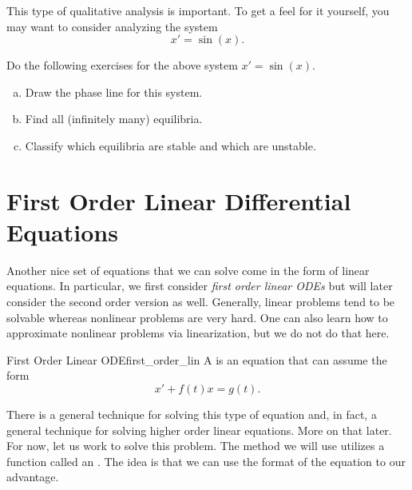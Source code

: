                 This type of qualitative analysis is important.  To get a feel for it yourself, you may want to consider analyzing the system
                \[
                x' = \sin(x).
                \]
                \begin{exercise} Do the following exercises for the above system $x'=\sin(x)$.
                \begin{enumerate}[(a)]
                    \item Draw the phase line for this system.
                    \item Find all (infinitely many) equilibria.  
                    \item Classify which equilibria are stable and which are unstable.
                \end{enumerate}
                \end{exercise}
        
        
        \section{First Order Linear Differential Equations}
        
        Another nice set of equations that we can solve come in the form of linear equations.  In particular, we first consider \emph{first order linear ODEs} but will later consider the second order version as well.  Generally, linear problems tend to be solvable whereas nonlinear problems are very hard.  One can also learn how to approximate nonlinear problems via linearization, but we do not do that here.
        
        \begin{df}{First Order Linear ODE}{first_order_lin}
            A  is an equation that can assume the form
            \[
            x'+f(t)x=g(t).
            \]
        \end{df}
        
        There is a general technique for solving this type of equation and, in fact, a general technique for solving higher order linear equations.  More on that later.  For now, let us work to solve this problem.  The method we will use utilizes a function called an . The idea is that we can use the format of the equation to our advantage.
        
